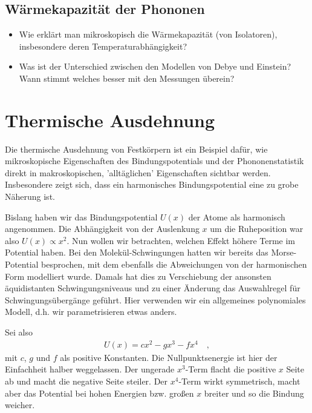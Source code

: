 \subsection*{Wärmekapazität der Phononen}

\begin{itemize}\setlength{\itemsep}{0pt}
    \item Wie erklärt man mikroskopisch die Wärmekapazität (von Isolatoren), insbesondere deren Temperaturabhängigkeit?
    \item Was ist der Unterschied zwischen den Modellen von Debye und Einstein? Wann stimmt welches besser mit den Messungen überein? 
\end{itemize}






\section{Thermische Ausdehnung}

Die thermische Ausdehnung von Festkörpern ist ein Beispiel dafür, wie mikroskopische Eigenschaften des Bindungspotentials und der Phononenstatistik direkt in makroskopischen, 'alltäglichen' Eigenschaften sichtbar werden. Insbesondere zeigt sich, dass ein harmonisches Bindungspotential eine zu grobe Näherung ist.

Bislang haben wir das Bindungspotential $U(x)$ der Atome als harmonisch angenommen. Die Abhängigkeit von der Auslenkung $x$ um die Ruheposition war also $U(x) \propto x^2$. Nun wollen wir betrachten, welchen Effekt höhere Terme im Potential haben. Bei den Molekül-Schwingungen hatten wir bereits das Morse-Potential besprochen, mit dem ebenfalls die Abweichungen von der harmonischen Form modelliert wurde. Damals hat dies zu Verschiebung der ansonsten äquidistanten Schwingungsniveaus und zu einer Änderung das Auswahlregel für Schwingungsübergänge geführt. Hier verwenden wir ein allgemeines polynomiales Modell, d.h. wir parametrisieren etwas anders.

Sei also 
\begin{eqnarray}
    U(x) = c x^2 - g x^3 - f x^4 \quad ,
\end{eqnarray}
mit $c$, $g$ und $f$ als positive Konstanten. Die Nullpunktsenergie ist hier der Einfachheit halber weggelassen. Der ungerade $x^3$-Term flacht die positive $x$ Seite ab und macht die negative Seite steiler. Der $x^4$-Term wirkt symmetrisch, macht aber das Potential bei hohen Energien bzw. großen $x$  breiter und so die Bindung weicher.

